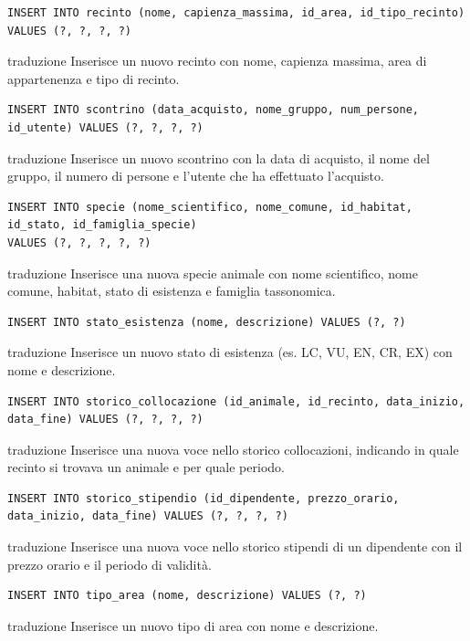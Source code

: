 \documentclass[12pt,a4paper]{report}
\begin{document}
\begin{lstlisting}[style=sqlstyle]
INSERT INTO recinto (nome, capienza_massima, id_area, id_tipo_recinto) VALUES (?, ?, ?, ?)
\end{lstlisting}
traduzione {Inserisce un nuovo recinto con nome, capienza massima, area di appartenenza e tipo di recinto.}

\begin{lstlisting}[style=sqlstyle]
INSERT INTO scontrino (data_acquisto, nome_gruppo, num_persone, id_utente) VALUES (?, ?, ?, ?)
\end{lstlisting}
traduzione {Inserisce un nuovo scontrino con la data di acquisto, il nome del gruppo, il numero di persone e l'utente che ha effettuato l'acquisto.}

\begin{lstlisting}[style=sqlstyle]
INSERT INTO specie (nome_scientifico, nome_comune, id_habitat, id_stato, id_famiglia_specie)
VALUES (?, ?, ?, ?, ?)
\end{lstlisting}
traduzione {Inserisce una nuova specie animale con nome scientifico, nome comune, habitat, stato di esistenza e famiglia tassonomica.}

\begin{lstlisting}[style=sqlstyle]
INSERT INTO stato_esistenza (nome, descrizione) VALUES (?, ?)
\end{lstlisting}
traduzione {Inserisce un nuovo stato di esistenza (es. LC, VU, EN, CR, EX) con nome e descrizione.}

\begin{lstlisting}[style=sqlstyle]
INSERT INTO storico_collocazione (id_animale, id_recinto, data_inizio, data_fine) VALUES (?, ?, ?, ?)
\end{lstlisting}
traduzione {Inserisce una nuova voce nello storico collocazioni, indicando in quale recinto si trovava un animale e per quale periodo.}

\begin{lstlisting}[style=sqlstyle]
INSERT INTO storico_stipendio (id_dipendente, prezzo_orario, data_inizio, data_fine) VALUES (?, ?, ?, ?)
\end{lstlisting}
traduzione {Inserisce una nuova voce nello storico stipendi di un dipendente con il prezzo orario e il periodo di validità.}

\begin{lstlisting}[style=sqlstyle]
INSERT INTO tipo_area (nome, descrizione) VALUES (?, ?)
\end{lstlisting}
traduzione {Inserisce un nuovo tipo di area con nome e descrizione.}
\end{document}
